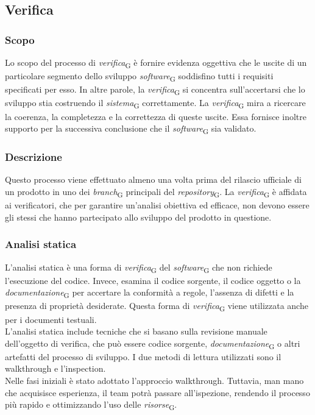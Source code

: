 \subsection{Verifica}
\subsubsection{Scopo}
Lo scopo del processo di \textit{verifica}\textsubscript{G} è fornire evidenza oggettiva che le uscite di un particolare segmento dello sviluppo \textit{software}\textsubscript{G} soddisfino tutti i requisiti specificati per esso. In altre parole, la \textit{verifica}\textsubscript{G} si concentra sull'accertarsi che lo sviluppo stia costruendo il \textit{sistema}\textsubscript{G} correttamente.
La \textit{verifica}\textsubscript{G} mira a ricercare la coerenza, la completezza e la correttezza di queste uscite. Essa fornisce inoltre supporto per la successiva conclusione che il \textit{software}\textsubscript{G} sia validato.

\subsubsection{Descrizione}
Questo processo viene effettuato almeno una volta prima del rilascio ufficiale di un prodotto in uno dei \textit{branch}\textsubscript{G} principali del \textit{repository}\textsubscript{G}. La \textit{verifica}\textsubscript{G} è affidata ai verificatori, che per garantire un'analisi obiettiva ed efficace, non devono essere gli stessi che hanno partecipato allo sviluppo del prodotto in questione.

\subsubsection{Analisi statica}
L'analisi statica è una forma di \textit{verifica}\textsubscript{G} del \textit{software}\textsubscript{G} che non richiede l'esecuzione del codice. Invece, esamina il codice sorgente, il codice oggetto o la \textit{documentazione}\textsubscript{G} per accertare la conformità a regole, l'assenza di difetti e la presenza di proprietà desiderate. Questa forma di \textit{verifica}\textsubscript{G} viene utilizzata anche per i documenti testuali. \\
L'analisi statica include tecniche che si basano sulla revisione manuale dell'oggetto di verifica, che può essere codice sorgente, \textit{documentazione}\textsubscript{G} o altri artefatti del processo di sviluppo. I due metodi di lettura utilizzati sono il walkthrough e l'inspection. \\
Nelle fasi iniziali è stato adottato l’approccio walkthrough. Tuttavia, man mano che acquisisce esperienza, il team potrà passare all’ispezione, rendendo il processo più rapido e ottimizzando l’uso delle \textit{risorse}\textsubscript{G}.

